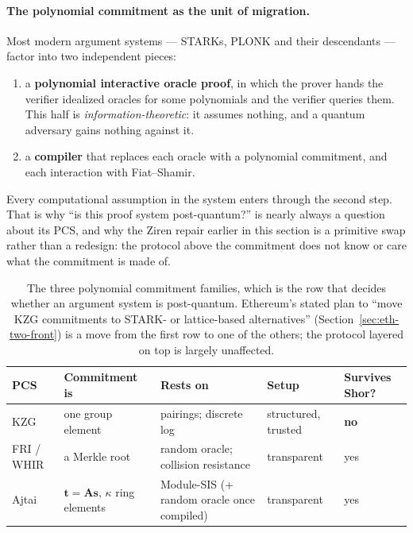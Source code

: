 \paragraph{The polynomial commitment as the unit of migration.}
Most modern argument systems --- STARKs, PLONK and their descendants
--- factor into two independent pieces:
\begin{enumerate}
  \item a \textbf{polynomial interactive oracle proof}, in which the prover hands
        the verifier idealized oracles for some polynomials and the verifier
        queries them. This half is \emph{information-theoretic}: it assumes
        nothing, and a quantum adversary gains nothing against it.
  \item a \textbf{compiler} that replaces each oracle with a polynomial
        commitment, and each interaction with Fiat--Shamir.
\end{enumerate}
Every computational assumption in the system enters through the second step.
That is why ``is this proof system post-quantum?'' is nearly always a question
about its PCS, and why the Ziren repair earlier in this section is a primitive
swap rather than a redesign: the protocol above the commitment does not know or
care what the commitment is made of.

\begin{table}[H]
\centering
\small
\begin{tabular}{@{}p{2.3cm}p{3.5cm}p{3.4cm}p{2.2cm}p{2.4cm}@{}}
\toprule
PCS & Commitment is & Rests on & Setup & Survives Shor? \\
\midrule
KZG & one group element & pairings; discrete log & structured, trusted & \textbf{no} \\
FRI / WHIR & a Merkle root & random oracle; collision resistance & transparent & yes \\
Ajtai & $\mathbf{t}=\mathbf{A}\mathbf{s}$, $\kappa$ ring elements & Module-SIS (+ random oracle once compiled) & transparent & yes \\
\bottomrule
\end{tabular}
\caption{The three polynomial commitment families, which is the row that decides
whether an argument system is post-quantum. Ethereum's stated plan to ``move KZG
commitments to STARK- or lattice-based alternatives'' (Section~\ref{sec:eth-two-front})
is a move from the first row to one of the others; the protocol layered on top is
largely unaffected.}
\label{tab:pcs-families}
\end{table}

